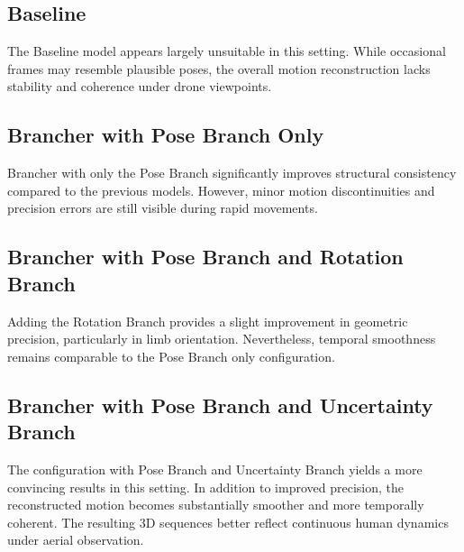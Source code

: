 \subsection*{Baseline}
The Baseline model appears largely unsuitable in this setting. While occasional frames may resemble plausible poses, the overall motion reconstruction lacks stability and coherence under drone viewpoints.


\subsection*{Brancher with Pose Branch Only}
Brancher with only the Pose Branch significantly improves structural consistency compared to the previous models. However, minor motion discontinuities and precision errors are still visible during rapid 
movements.

\subsection*{Brancher with Pose Branch and Rotation Branch}
Adding the Rotation Branch provides a slight improvement in geometric precision, particularly in limb orientation. Nevertheless, temporal smoothness remains comparable to the Pose Branch only configuration.

\subsection*{Brancher with Pose Branch and Uncertainty Branch}
The configuration with Pose Branch and Uncertainty Branch yields a more convincing results in this setting. In addition to improved precision, the reconstructed motion becomes substantially smoother and 
more temporally coherent. The resulting 3D sequences better reflect continuous human dynamics under aerial observation.


